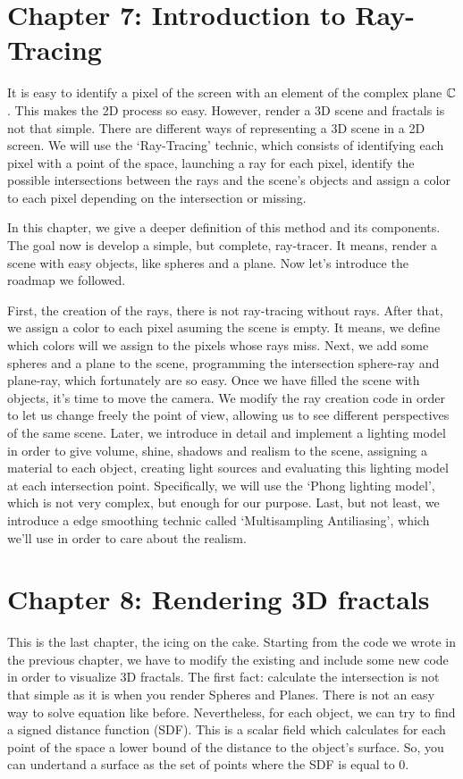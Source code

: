 \section*{Chapter 7: Introduction to Ray-Tracing}

It is easy to identify a pixel of the screen with an element of the complex plane $\mathbb{C}$. This makes the 2D process so easy. However, render a 3D scene and fractals is not that simple. There are different ways of representing a 3D scene in a 2D screen. We will use the `Ray-Tracing' technic, which consists of identifying each pixel with a point of the space, launching a ray for each pixel, identify the possible intersections between the rays and the scene's objects and assign a color to each pixel depending on the intersection or missing.

In this chapter, we give a deeper definition of this method and its components. The goal now is develop a simple, but complete, ray-tracer. It means, render a scene with easy objects, like spheres and a plane. Now let's introduce the roadmap we followed.

First, the creation of the rays, there is not ray-tracing without rays. After that, we assign a color to each pixel asuming the scene is empty. It means, we define which colors will we assign to the pixels whose rays miss. Next, we add some spheres and a plane to the scene, programming the intersection sphere-ray and plane-ray, which fortunately are so easy. Once we have filled the scene with objects, it's time to move the camera. We modify the ray creation code in order to let us change freely the point of view, allowing us to see different perspectives of the same scene. Later, we introduce in detail and implement a lighting model in order to give volume, shine, shadows and realism to the scene, assigning a material to each object, creating light sources and evaluating this lighting model at each intersection point. Specifically, we will use the `Phong lighting model', which is not very complex, but enough for our purpose. Last, but not least, we introduce a edge smoothing technic called `Multisampling Antiliasing', which we'll use in order to care about the realism.

\section*{Chapter 8: Rendering 3D fractals}

This is the last chapter, the icing on the cake. Starting from the code we wrote in the previous chapter, we have to modify the existing and include some new code in order to visualize 3D fractals. The first fact: calculate the intersection is not that simple as it is when you render Spheres and Planes. There is not an easy way to solve equation like before. Nevertheless, for each object, we can try to find a signed distance function (SDF). This is a scalar field which calculates for each point of the space a lower bound of the distance to the object's surface. So, you can undertand a surface as the set of points where the SDF is equal to 0.

